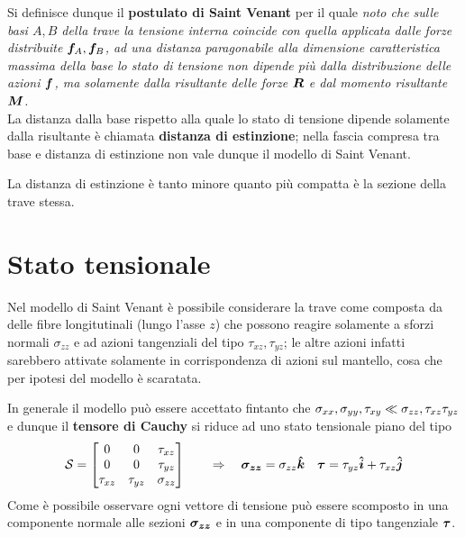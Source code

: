 	\begin{concetto}
		Si definisce dunque il \textbf{postulato di Saint Venant} per il quale \textit{noto che sulle basi $A,B$ della trave la tensione interna coincide con quella applicata dalle forze distribuite $\boldsymbol{f}_A,\boldsymbol{f}_B$, ad una distanza paragonabile alla dimensione caratteristica massima della base lo stato di tensione non dipende più dalla distribuzione delle azioni $\boldsymbol{f}$, ma solamente dalla risultante delle forze $\boldsymbol{R}$ e dal momento risultante $\boldsymbol{M}$.} \\
		La distanza dalla base rispetto alla quale lo stato di tensione dipende solamente dalla risultante è chiamata \textbf{distanza di estinzione}; nella fascia compresa tra base e distanza di estinzione non vale dunque il modello di Saint Venant.
	\end{concetto}
	\begin{osservazione}
		La distanza di estinzione è tanto minore quanto più compatta è la sezione della trave stessa.
	\end{osservazione}

\section{Stato tensionale}
	Nel modello di Saint Venant è possibile considerare la trave come composta da delle fibre longitutinali (lungo l'asse $z$) che possono reagire solamente a sforzi normali $\sigma_{zz}$ e ad azioni tangenziali del tipo $\tau_{xz},\tau_{yz}$; le altre azioni infatti sarebbero attivate solamente in corrispondenza di azioni sul mantello, cosa che per ipotesi del modello è scaratata. 
	
	In generale il modello può essere accettato fintanto che $\sigma_{xx},\sigma_{yy},\tau_{xy} \ll \sigma_{zz},\tau_{xz}\tau_{yz}$ e dunque il \textbf{tensore di Cauchy} si riduce ad uno stato tensionale piano del tipo
	\begin{equation}
		\mathcal S = \begin{bmatrix} \label{eq:sv:tensorecauchy}
			0 & 0 & \tau_{xz} \\ 0 & 0 & \tau_{yz} \\ \tau_{xz} & \tau_{yz} & \sigma_{zz}
		\end{bmatrix} \qquad \Rightarrow \quad \boldsymbol{\sigma_{zz}} = \sigma_{zz} \boldsymbol{\hat{k}} \quad \boldsymbol{\tau} = \tau_{yz} \boldsymbol{\hat{i}} + \tau_{xz} \boldsymbol{\hat{j}}
	\end{equation}
	Come è possibile osservare ogni vettore di tensione può essere scomposto in una componente normale alle sezioni $\boldsymbol{\sigma_{zz}}$ e in una componente di tipo tangenziale $\boldsymbol{\tau}$.
	
